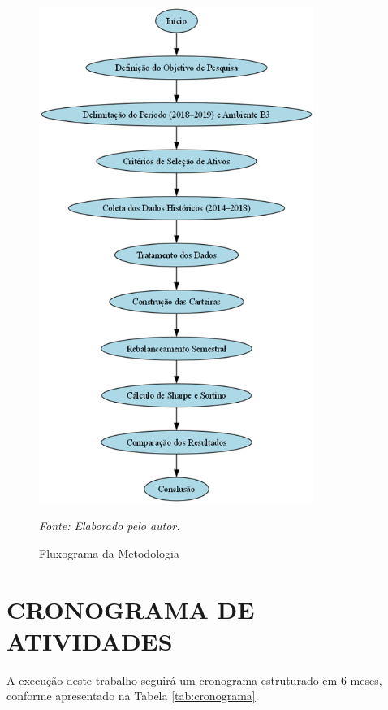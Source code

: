 \begin{figure}[H]
\centering
\includegraphics[width=0.8\textwidth]{image.png}
\caption{Fluxograma da Metodologia}
\textit{Fonte: Elaborado pelo autor.}
\label{fig:fluxograma_metodologia}
\end{figure}

\section{CRONOGRAMA DE ATIVIDADES}

A execução deste trabalho seguirá um cronograma estruturado em 6 meses, conforme apresentado na Tabela \ref{tab:cronograma}.

